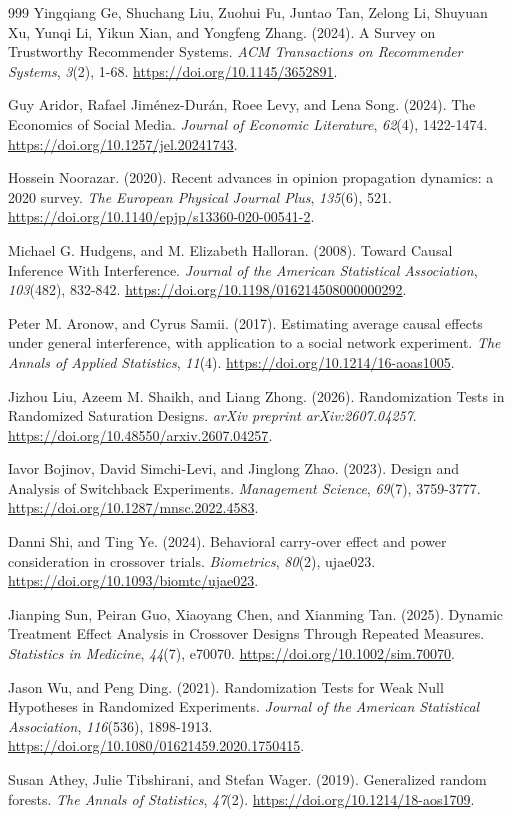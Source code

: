 \begin{thebibliography}{999}
Yingqiang Ge, Shuchang Liu, Zuohui Fu, Juntao Tan, Zelong Li, Shuyuan Xu, Yunqi Li, Yikun Xian, and Yongfeng Zhang. (2024). A Survey on Trustworthy Recommender Systems. \textit{ACM Transactions on Recommender Systems}, \textit{3}(2), 1-68. \url{https://doi.org/10.1145/3652891}.

Guy Aridor, Rafael Jim\'{e}nez-Dur\'{a}n, Roee Levy, and Lena Song. (2024). The Economics of Social Media. \textit{Journal of Economic Literature}, \textit{62}(4), 1422-1474. \url{https://doi.org/10.1257/jel.20241743}.

Hossein Noorazar. (2020). Recent advances in opinion propagation dynamics: a 2020 survey. \textit{The European Physical Journal Plus}, \textit{135}(6), 521. \url{https://doi.org/10.1140/epjp/s13360-020-00541-2}.

Michael G. Hudgens, and M. Elizabeth Halloran. (2008). Toward Causal Inference With Interference. \textit{Journal of the American Statistical Association}, \textit{103}(482), 832-842. \url{https://doi.org/10.1198/016214508000000292}.

Peter M. Aronow, and Cyrus Samii. (2017). Estimating average causal effects under general interference, with application to a social network experiment. \textit{The Annals of Applied Statistics}, \textit{11}(4). \url{https://doi.org/10.1214/16-aoas1005}.

Jizhou Liu, Azeem M. Shaikh, and Liang Zhong. (2026). Randomization Tests in Randomized Saturation Designs. \textit{arXiv preprint arXiv:2607.04257}. \url{https://doi.org/10.48550/arxiv.2607.04257}.

Iavor Bojinov, David Simchi-Levi, and Jinglong Zhao. (2023). Design and Analysis of Switchback Experiments. \textit{Management Science}, \textit{69}(7), 3759-3777. \url{https://doi.org/10.1287/mnsc.2022.4583}.

Danni Shi, and Ting Ye. (2024). Behavioral carry-over effect and power consideration in crossover trials. \textit{Biometrics}, \textit{80}(2), ujae023. \url{https://doi.org/10.1093/biomtc/ujae023}.

Jianping Sun, Peiran Guo, Xiaoyang Chen, and Xianming Tan. (2025). Dynamic Treatment Effect Analysis in Crossover Designs Through Repeated Measures. \textit{Statistics in Medicine}, \textit{44}(7), e70070. \url{https://doi.org/10.1002/sim.70070}.

Jason Wu, and Peng Ding. (2021). Randomization Tests for Weak Null Hypotheses in Randomized Experiments. \textit{Journal of the American Statistical Association}, \textit{116}(536), 1898-1913. \url{https://doi.org/10.1080/01621459.2020.1750415}.

Susan Athey, Julie Tibshirani, and Stefan Wager. (2019). Generalized random forests. \textit{The Annals of Statistics}, \textit{47}(2). \url{https://doi.org/10.1214/18-aos1709}.

\end{thebibliography}

